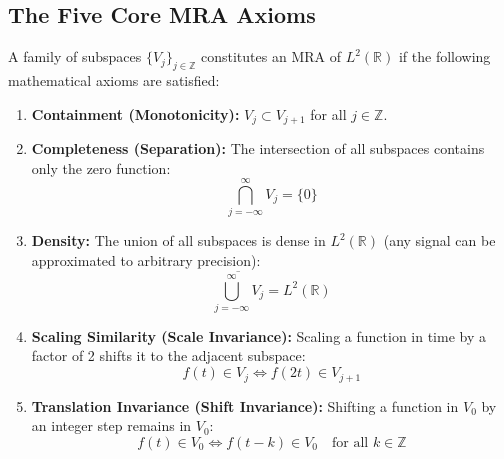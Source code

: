 \documentclass[12pt,a4paper]{article}
\begin{document}
\subsection{The Five Core MRA Axioms}
A family of subspaces $\{V_j\}_{j\in\mathbb{Z}}$ constitutes an MRA of $L^2(\mathbb{R})$ if the following mathematical axioms are satisfied:
\begin{enumerate}[leftmargin=*, itemsep=4pt]
  \item \textbf{Containment (Monotonicity):} $V_j \subset V_{j+1}$ for all $j \in \mathbb{Z}$.
  \item \textbf{Completeness (Separation):} The intersection of all subspaces contains only the zero function:
$$\bigcap_{j=-\infty}^{\infty} V_j = \{0\}$$
  \item \textbf{Density:} The union of all subspaces is dense in $L^2(\mathbb{R})$ (any signal can be approximated to arbitrary precision):
$$\overline{\bigcup_{j=-\infty}^{\infty} V_j} = L^2(\mathbb{R})$$
  \item \textbf{Scaling Similarity (Scale Invariance):} Scaling a function in time by a factor of 2 shifts it to the adjacent subspace:
$$f(t) \in V_j \iff f(2t) \in V_{j+1}$$
  \item \textbf{Translation Invariance (Shift Invariance):} Shifting a function in $V_0$ by an integer step remains in $V_0$:
$$f(t) \in V_0 \iff f(t-k) \in V_0 \quad \text{for all } k \in \mathbb{Z}$$
\end{enumerate}

\begin{tcolorbox}[tikzbox, title={Nested Vector Subspaces Hierarchy}]
\centering
{}
\end{tcolorbox}
\end{document}
